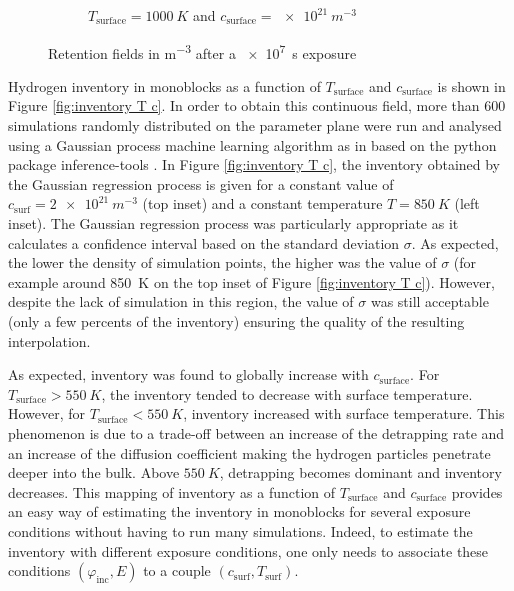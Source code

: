 \begin{figure}
\begin{subfigure}{0.5\linewidth}
        \caption{$T_\mathrm{surface} = \SI{1000}{K}$ and $c_\mathrm{surface} = \SI{e21}{m^{-3}}$}
    \end{subfigure}
    \caption{Retention fields in \si{m^{-3}} after a \SI{e7}{s} exposure}
    \label{fig:retention fields}
\end{figure}


Hydrogen inventory in monoblocks as a function of $T_\mathrm{surface}$ and $c_\mathrm{surface}$ is shown in Figure \ref{fig:inventory T c}.
In order to obtain this continuous field, more than 600 simulations randomly distributed on the parameter plane were run and analysed using a Gaussian process machine learning algorithm  as in  based on the python package inference-tools .
In Figure \ref{fig:inventory T c}, the inventory obtained by the Gaussian regression process is given for a constant value of $c_\mathrm{surf}=\SI{2e21}{m^{-3}}$ (top inset) and a constant temperature $T=\SI{850}{K}$ (left inset).
The Gaussian regression process was particularly appropriate as it calculates a confidence interval based on the standard deviation $\sigma$.
As expected, the lower the density of simulation points, the higher was the value of $\sigma$ (for example around \SI{850}{K} on the top inset of Figure \ref{fig:inventory T c}).
However, despite the lack of simulation in this region, the value of $\sigma$ was still acceptable (only a few percents of the inventory) ensuring the quality of the resulting interpolation.

As expected, inventory was found to globally increase with $c_\mathrm{surface}$.
For $T_\mathrm{surface} > \SI{550}{K}$, the inventory tended to decrease with surface temperature.
However, for $T_\mathrm{surface} < \SI{550}{K}$, inventory increased with surface temperature.
This phenomenon is due to a trade-off between an increase of the detrapping rate and an increase of the diffusion coefficient making the hydrogen particles penetrate deeper into the bulk.
Above $\SI{550}{K}$, detrapping becomes dominant and inventory decreases.
This mapping of inventory as a function of $T_\mathrm{surface}$ and $c_\mathrm{surface}$ provides an easy way of estimating the inventory in monoblocks for several exposure conditions without having to run many simulations.
Indeed, to estimate the inventory with different exposure conditions, one only needs to associate these conditions $(\varphi_\mathrm{inc}, E)$ to a couple $(c_\mathrm{surf}, T_\mathrm{surf})$.

